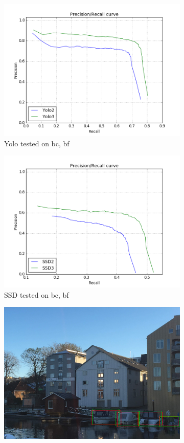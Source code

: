 \begin{figure}[h!]
\begin{subfigure}{.5\textwidth}
  \centering
  \includegraphics[width=0.8\linewidth]{results/case_buildings/prec_recall/yolo/bcbf.png}
  \caption{Yolo tested on bc, bf}
  \label{fig:ex_bcbf_prec_rec_yolo}
\end{subfigure}%
\begin{subfigure}{.5\textwidth}
  \centering
  \includegraphics[width=.8\linewidth]{results/case_buildings/prec_recall/ssd/bcbf.png}
  \caption{SSD tested on bc, bf}
  \label{fig:ex_bcbf_prec_rec_ssd}
\end{subfigure}
\begin{subfigure}{.5\textwidth}
  \centering
  \includegraphics[width=0.8\linewidth]{results/case_buildings/prec_recall/yolo/IMG_2077_bbnb.jpg}

\end{subfigure}
\end{figure}
